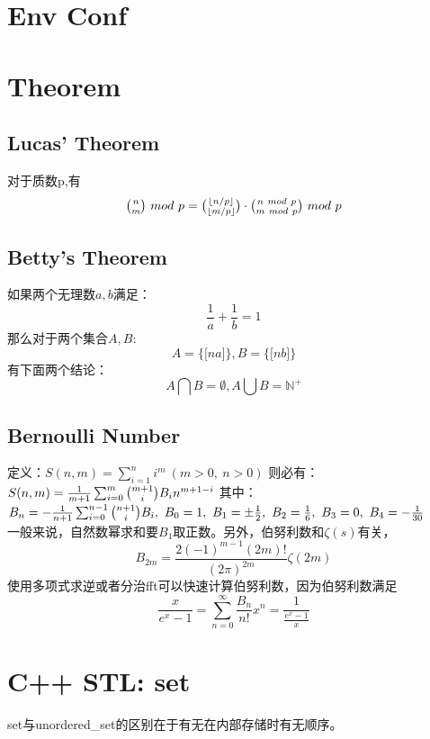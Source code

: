 \documentclass[10pt,UTF8,a4paper,twoside]{ctexart}
\begin{document}
\begin{multicols}{2}

\begin{appendices}
	\section{Env Conf}
		
		
		
		
		
	
	\section{Theorem}
		\large
		\subsection{Lucas' Theorem}
			对于质数p,有
			$$
				\tbinom{n}{m} \ mod \ p = \tbinom{\lfloor n/p \rfloor}{\lfloor m/p \rfloor}
				\cdot \tbinom{n \ mod \ p}{m \ mod \ p} \ mod \ p
			$$
		\subsection{Betty's Theorem}
			如果两个无理数$a,b$满足：
			$$ \frac{1}{a}+\frac{1}{b}=1$$
			那么对于两个集合$A,B$:
			$$A=\lbrace \lbrack na \rbrack \rbrace,B=\lbrace \lbrack nb \rbrack \rbrace$$
			有下面两个结论：
			$$A \bigcap B = \emptyset,A \bigcup B = \mathbb{N}^+$$
		\subsection{Bernoulli Number}
			定义：$S(n, m) = \sum_{i=1}^{n}{i^m} \ (m > 0, \ n > 0)$
			则必有：$S(n, m)=\frac{1}{m+1}\sum_{i=0}^{m}{\tbinom{m+1}{i}B_{i}n^{m+1-i}}$
			其中：$B_n=-\frac{1}{n+1}\sum_{i=0}^{n-1}\tbinom{n+1}{i}B_i, \ B_0=1,\ B_1=\pm\frac{1}{2},\ B_2=\frac{1}{6},\ B_3=0,\ B_4=-\frac{1}{30}$ \\
			一般来说，自然数幂求和要$B_1$取正数。另外，伯努利数和$\zeta(s)$有关，
			$$ B_{2m} = \frac{2(-1)^{m-1}(2m)!}{(2\pi)^{2m}} \zeta(2m) $$
			使用多项式求逆或者分治fft可以快速计算伯努利数，因为伯努利数满足
			$$ \frac{x}{e^x-1} = \sum_{n=0}^{\infty}\frac{B_n}{n!}x^n = \frac{1}{\frac{e^x-1}{x}} $$
	\section{C++ STL: set}
		\large
		set与unordered\_set的区别在于有无在内部存储时有无顺序。

\end{appendices}
\end{multicols}
\end{document}
